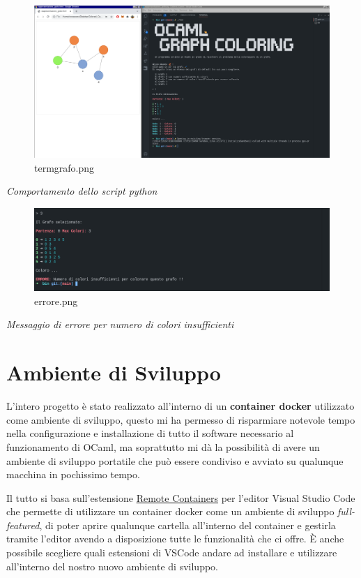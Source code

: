 \documentclass[11pt]{article}
\begin{document}
    \begin{figure}
\centering
\includegraphics{Colored Camel_files/termgrafo.png}
\caption{termgrafo.png}
\end{figure}

\emph{Comportamento dello script python}

    \begin{figure}
\centering
\includegraphics{Colored Camel_files/errore.png}
\caption{errore.png}
\end{figure}

\emph{Messaggio di errore per numero di colori insufficienti}

\newpage

\section{\texorpdfstring{Ambiente di Sviluppo 
}{Ambiente di Sviluppo }}\label{ambiente-di-sviluppo}

    L'intero progetto è stato realizzato all'interno di un \textbf{container
docker} utilizzato come ambiente di sviluppo, questo mi ha permesso di
risparmiare notevole tempo nella configurazione e installazione di tutto
il software necessario al funzionamento di OCaml, ma soprattutto mi dà
la possibilità di avere un ambiente di sviluppo portatile che può essere
condiviso e avviato su qualunque macchina in pochissimo tempo.

Il tutto si basa sull'estensione
\href{https://code.visualstudio.com/docs/remote/containers}{Remote
Containers} per l'editor Visual Studio Code che permette di utilizzare
un container docker come un ambiente di sviluppo \emph{full-featured},
di poter aprire qualunque cartella all'interno del container e gestirla
tramite l'editor avendo a disposizione tutte le funzionalità che ci
offre. È anche possibile scegliere quali estensioni di VSCode andare ad
installare e utilizzare all'interno del nostro nuovo ambiente di
sviluppo.
\end{document}
